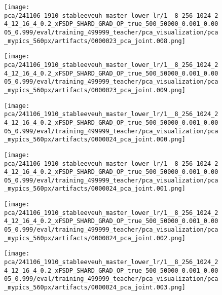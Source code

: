 \begin{figure*}[p]
\begin{subfigure}[t]{0.097\textwidth}
    \end{subfigure}\hfill
    \begin{subfigure}[t]{0.097\textwidth}
        \centering
        \texttt{[image: pca/241106\_1910\_stableeveuh\_master\_lower\_lr/1\_\_8\_256\_1024\_24\_12\_16\_4\_0.2\_xFSDP\_SHARD\_GRAD\_OP\_true\_500\_50000\_0.001\_0.0005\_0.999/eval/training\_499999\_teacher/pca\_visualization/pca\_mypics\_560px/artifacts/0000023\_pca\_joint.008.png]}
    \end{subfigure}\hfill
    \begin{subfigure}[t]{0.097\textwidth}
        \centering
        \texttt{[image: pca/241106\_1910\_stableeveuh\_master\_lower\_lr/1\_\_8\_256\_1024\_24\_12\_16\_4\_0.2\_xFSDP\_SHARD\_GRAD\_OP\_true\_500\_50000\_0.001\_0.0005\_0.999/eval/training\_499999\_teacher/pca\_visualization/pca\_mypics\_560px/artifacts/0000023\_pca\_joint.009.png]}
    \end{subfigure}
    \begin{subfigure}[t]{0.097\textwidth}
        \centering
        \texttt{[image: pca/241106\_1910\_stableeveuh\_master\_lower\_lr/1\_\_8\_256\_1024\_24\_12\_16\_4\_0.2\_xFSDP\_SHARD\_GRAD\_OP\_true\_500\_50000\_0.001\_0.0005\_0.999/eval/training\_499999\_teacher/pca\_visualization/pca\_mypics\_560px/artifacts/0000024\_pca\_joint.000.png]}
    \end{subfigure}\hfill
    \begin{subfigure}[t]{0.097\textwidth}
        \centering
        \texttt{[image: pca/241106\_1910\_stableeveuh\_master\_lower\_lr/1\_\_8\_256\_1024\_24\_12\_16\_4\_0.2\_xFSDP\_SHARD\_GRAD\_OP\_true\_500\_50000\_0.001\_0.0005\_0.999/eval/training\_499999\_teacher/pca\_visualization/pca\_mypics\_560px/artifacts/0000024\_pca\_joint.001.png]}
    \end{subfigure}\hfill
    \begin{subfigure}[t]{0.097\textwidth}
        \centering
        \texttt{[image: pca/241106\_1910\_stableeveuh\_master\_lower\_lr/1\_\_8\_256\_1024\_24\_12\_16\_4\_0.2\_xFSDP\_SHARD\_GRAD\_OP\_true\_500\_50000\_0.001\_0.0005\_0.999/eval/training\_499999\_teacher/pca\_visualization/pca\_mypics\_560px/artifacts/0000024\_pca\_joint.002.png]}
    \end{subfigure}\hfill
    \begin{subfigure}[t]{0.097\textwidth}
        \centering
        \texttt{[image: pca/241106\_1910\_stableeveuh\_master\_lower\_lr/1\_\_8\_256\_1024\_24\_12\_16\_4\_0.2\_xFSDP\_SHARD\_GRAD\_OP\_true\_500\_50000\_0.001\_0.0005\_0.999/eval/training\_499999\_teacher/pca\_visualization/pca\_mypics\_560px/artifacts/0000024\_pca\_joint.003.png]}

\end{subfigure}
\end{figure*}

